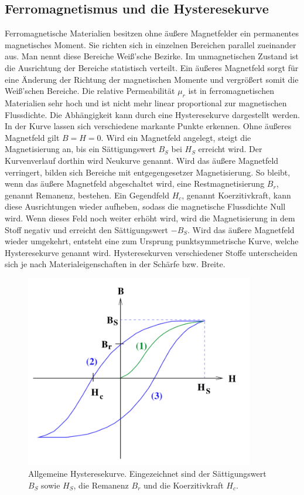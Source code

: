\subsection{Ferromagnetismus und die Hysteresekurve}
Ferromagnetische Materialien besitzen ohne äußere Magnetfelder ein permanentes 
magnetisches Moment. Sie richten sich in einzelnen Bereichen parallel zueinander aus. 
Man nennt diese Bereiche Weiß'sche Bezirke. Im unmagnetischen Zustand ist die 
Ausrichtung der Bereiche statistisch verteilt. Ein äußeres Magnetfeld sorgt für eine 
Änderung der Richtung der magnetischen Momente und vergrößert somit die Weiß'schen 
Bereiche. 
\newline
Die relative Permeabilität $\mu_{r}$ ist in ferromagnetischen Materialien sehr hoch 
und ist nicht mehr linear proportional zur magnetischen Flussdichte. 
Die Abhängigkeit kann durch eine Hysteresekurve dargestellt werden.
In der Kurve lassen sich verschiedene markante Punkte erkennen. 
Ohne äußeres Magnetfeld gilt $B = H = 0$. Wird ein Magnetfeld angelegt, steigt die 
Magnetisierung an, bis ein Sättigungswert $B_{S}$ bei $H_{S}$ erreicht wird. Der 
Kurvenverlauf dorthin wird Neukurve genannt. 
Wird das äußere Magnetfeld verringert, bilden sich Bereiche mit entgegengesetzer 
Magnetisierung. So bleibt, wenn das äußere Magnetfeld abgeschaltet wird, eine 
Restmagnetisierung $B_{r}$, genannt Remanenz, bestehen. 
Ein Gegendfeld $H_{c}$, genannt Koerzitivkraft, kann diese Ausrichtungen wieder 
aufheben, sodass die magnetische Flussdichte Null wird. Wenn dieses Feld noch weiter 
erhöht wird, wird die Magnetisierung %
in dem Stoff negativ und erreicht den Sättigungswert $-B_{S}$. Wird das äußere 
Magnetfeld wieder umgekehrt, entsteht eine zum Ursprung punktsymmetrische Kurve, welche
Hysteresekurve genannt wird. Hysteresekurven verschiedener Stoffe unterscheiden sich je
nach Materialeigenschaften in der Schärfe bzw. Breite. 
\begin{figure}
    \centering
    \includegraphics[width=10cm,hight=10cm]{build/Hysteresekurve.png}
    \caption{Allgemeine Hysteresekurve. Eingezeichnet sind der Sättigungswert $B_{S}$
    sowie $H_{S}$, die Remanenz $B_{r}$ und die Koerzitivkraft $H_{c}$.}
\end{figure}
